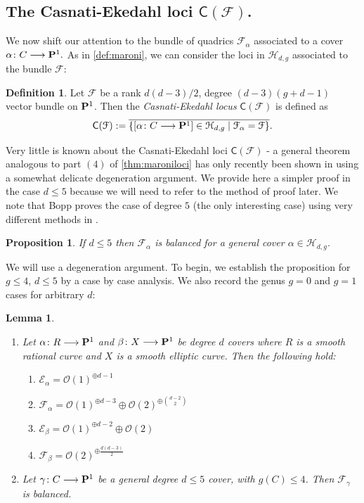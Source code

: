 \documentclass[reqno, 10 pt]{article}
\newtheorem{lem}[thm]{Lemma}
\newtheorem{prop}[thm]{Proposition}
\theoremstyle{definition}
\newtheorem{defn}[thm]{Definition}
\theoremstyle{remark}
\numberwithin{equation}{section}
\numberwithin{thm}{section}
\numberwithin{prop}{section}
\numberwithin{lem}{section}
\numberwithin{cor}{section}
\numberwithin{conj}{section}
\numberwithin{defn}{section}
\renewcommand{\H}{\mathcal H}
\renewcommand{\to}{\longrightarrow}
\newcommand{\sfC}{{\mathsf C}}
\newcommand{\cE}{{\mathcal E}}
\newcommand{\cF}{{\mathcal F}}
\newcommand{\cO}{{\mathcal O}}
\renewcommand{\P}{{\bf P}}
\newcommand {\from}{{\colon}}
\renewcommand{\H}{{\mathcal{H}}}
\begin{document}
\subsection{The Casnati-Ekedahl loci $\sfC(\cF)$.} We now shift our attention to the bundle of quadrics $\cF_{\alpha}$ associated to a cover $\alpha \from C \to \P^1.$  As in \autoref{def:maroni}, we can consider the loci in $\H_{d,g}$ associated to the bundle $\cF$: 
\begin{defn}\label{def:casnati}
Let $\cF$ be a rank $d(d-3)/2$, degree $(d-3)(g+d-1)$ vector bundle on $\P^1$.  Then the {\sl Casnati-Ekedahl locus} $\sfC(\cF)$ is defined as
\[\sfC(\cF) := \overline {\{[\alpha \from C \to \P^1] \in \H_{d,g} \mid \cF_{\alpha} = \cF\}}.\] 
\end{defn}

Very little is known about the Casnati-Ekedahl loci $\sfC(\cF)$ - a general theorem analogous to part $(4)$ of \autoref{thm:maroniloci} has only recently been shown in \cite{bujokas-patel} using a somewhat delicate degeneration argument. We provide here a simpler proof in the case $d \leq 5$ because we will need to refer to the method of proof later. We note that Bopp proves the case of degree $5$ (the only interesting case) using very different methods in \cite{bopp5}. 
\begin{prop}\label{gen:casnati}
If $d \leq 5$ then $\cF_{\alpha}$ is balanced for a general cover $\alpha \in \H_{d,g}$.  
\end{prop}


We will use a degeneration argument.  To begin, we establish the proposition for $g \leq 4$, $d \leq 5$ by a case by case analysis.  We also record the genus $g=0$ and $g=1$ cases for arbitrary $d$:
\begin{lem} \label{EF01}
\begin{enumerate}
\item Let $\alpha \colon R \to \P^1$ and $\beta \from X \to \P^1$ be degree $d$ covers where $R$ is a smooth rational curve and $X$ is a smooth elliptic curve. Then the following hold:
\begin{enumerate} 
\item $\cE_{\alpha} = \cO(1)^{\oplus d-1}$
\item $\cF_{\alpha} = \cO(1)^{\oplus d-3} \oplus \cO(2)^{\oplus {d-2 \choose 2}}$
\item $\cE_{\beta} = \cO(1)^{\oplus d-2} \oplus \cO(2)$
\item $\cF_{\beta} =  \cO(2)^{\oplus \frac{d(d-3)}{2}}$
\end{enumerate}

\item Let $\gamma \from C \to \P^1$ be a general degree $d \leq 5$ cover, with $g(C) \leq 4$.  Then $\cF_{\gamma}$ is balanced. 
\end{enumerate}
\end{lem}
\end{document}
